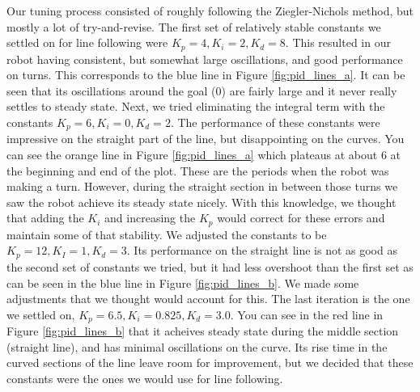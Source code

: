 \documentclass[12pt]{article}
\begin{document}
Our tuning process consisted of roughly following the Ziegler-Nichols method, but mostly a lot of try-and-revise. The first set of relatively stable constants we settled on for line following were $K_p=4,K_i=2,K_d=8$. This resulted in our robot having consistent, but somewhat large oscillations, and good performance on turns. This corresponds to the blue line in Figure \ref{fig:pid_lines_a}. It can be seen that its oscillations around the goal (0) are fairly large and it never really settles to steady state. Next, we tried eliminating the integral term with the constants $K_p=6,K_i=0,K_d=2$. The performance of these constants were impressive on the straight part of the line, but disappointing on the curves. You can see the orange line in Figure \ref{fig:pid_lines_a} which plateaus at about 6 at the beginning and end of the plot. These are the periods when the robot was making a turn. However, during the straight section in between those turns we saw the robot achieve its steady state nicely. With this knowledge, we thought that adding the $K_i$ and increasing the $K_p$ would correct for these errors and maintain some of that stability. We adjusted the constants to be $K_p=12,K_I=1,K_d=3$. Its performance on the straight line is not as good as the second set of constants we tried, but it had less overshoot than the first set as can be seen in the blue line in Figure \ref{fig:pid_lines_b}. We made some adjustments that we thought would account for this. The last iteration is the one we settled on, $K_p=6.5,K_i=0.825,K_d=3.0$. You can see in the red line in Figure \ref{fig:pid_lines_b} that it acheives steady state during the middle section (straight line), and has minimal oscillations on the curve. Its rise time in the curved sections of the line leave room for improvement, but we decided that these constants were the ones we would use for line following.
\end{document}

